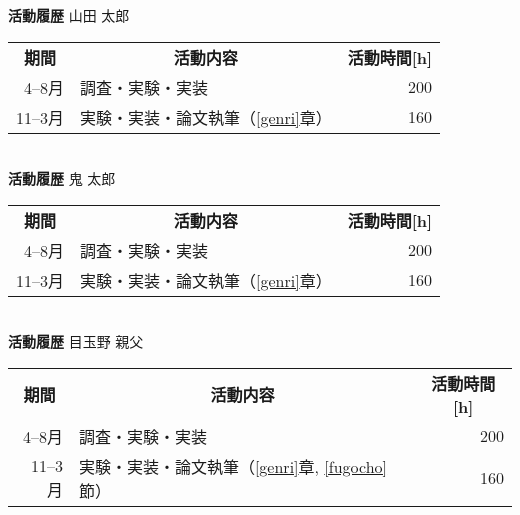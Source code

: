 
\thispagestyle{empty}

\begin{table}[tbp]
\large
\centering

\textbf{活動履歴} 山田 太郎\\
\begin{tabular}{rlr}
\hline
\multicolumn{1}{c}{\textbf{期間}}&
\multicolumn{1}{c}{\textbf{活動内容}}&
\multicolumn{1}{c}{\textbf{活動時間[h]}}
\\
4--8月 & 調査・実験・実装 & 200 \\
11--3月 & 実験・実装・論文執筆（\ref{genri}章） & 160\\
\hline
\end{tabular}\\
\vspace{2in}
\textbf{活動履歴} 鬼 太郎\\
\begin{tabular}{rlr}
\hline
\multicolumn{1}{c}{\textbf{期間}}&
\multicolumn{1}{c}{\textbf{活動内容}}&
\multicolumn{1}{c}{\textbf{活動時間[h]}}
\\
4--8月 & 調査・実験・実装 & 200 \\
11--3月 & 実験・実装・論文執筆（\ref{genri}章） & 160\\
\hline
\end{tabular}\\
\vspace{2in}
\textbf{活動履歴} 目玉野 親父\\
\begin{tabular}{rlr}
\hline
\multicolumn{1}{c}{\textbf{期間}}&
\multicolumn{1}{c}{\textbf{活動内容}}&
\multicolumn{1}{c}{\textbf{活動時間[h]}}
\\
4--8月 & 調査・実験・実装 & 200 \\
11--3月 & 実験・実装・論文執筆（\ref{genri}章, \ref{fugocho}節） & 160\\
\hline
\end{tabular}\\
\vspace{2in}
\end{table}
\clearpage

